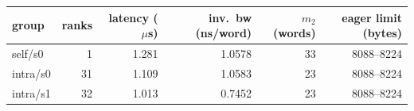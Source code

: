 \begin{tabular}{lrrrrr}
\toprule
group & ranks & latency ($\mu$s) & inv.\ bw (ns/word) & $m_2$ (words) & eager limit (bytes) \\
\midrule
self/s0 & 1 & 1.281 & 1.0578 & 33 & 8088--8224 \\
intra/s0 & 31 & 1.109 & 1.0583 & 23 & 8088--8224 \\
intra/s1 & 32 & 1.013 & 0.7452 & 23 & 8088--8224 \\
\bottomrule
\end{tabular}
